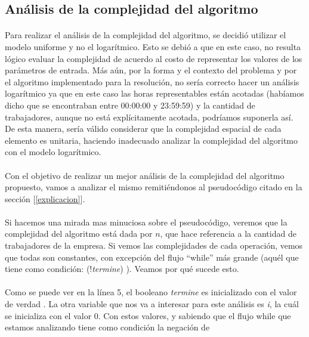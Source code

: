 \subsection{Análisis de la complejidad del algoritmo}

\paragraph{}
Para realizar el análisis de la complejidad del algoritmo, se decidió utilizar el modelo uniforme y no el logarítmico. Esto se debió a que en este caso, no resulta lógico evaluar la complejidad de acuerdo al costo de representar los valores de los parámetros de entrada. Más aún, por la forma y el contexto del problema y por el algoritmo implementado para la resolución, no sería correcto hacer un análisis logarítmico ya que en este caso las horas representables están acotadas (habíamos dicho que se encontraban entre 00:00:00 y 23:59:59) y la cantidad de trabajadores, aunque no está explícitamente acotada, podríamos suponerla así. De esta manera, sería válido considerar que la complejidad espacial de cada elemento es unitaria, haciendo inadecuado analizar la complejidad del algoritmo con el modelo logarítmico.

\paragraph{}
Con el objetivo de realizar un mejor análisis de la complejidad del algoritmo propuesto, vamos a analizar el mismo remitiéndonos al pseudocódigo citado en la sección [\ref{explicacion}].

\paragraph{}
Si hacemos una mirada mas minuciosa sobre el pseudocódigo, veremos que la complejidad del algoritmo está dada por $n$, que hace referencia a la cantidad de trabajadores de la empresa. Si vemos las complejidades de cada operación, vemos que todas son constantes, con excepción del flujo ``while'' más grande (aquél que tiene como condición: (!\textit{termine}) ). Veamos por qué sucede esto.

\paragraph{}
Como se puede ver en la línea 5, el booleano \textit{termine} es inicializado con el valor de verdad \false. La otra variable que nos va a interesar para este análisis es \textit{i}, la cuál se inicializa con el valor 0. Con estos valores, y sabiendo que el flujo while que estamos analizando tiene como condición la negación de 


